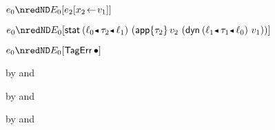 {\begin{lamportproof*}
    \begin{pfproof}
        \begin{pfproof}
          \qedstep
            \begin{pfproof}
              $\sexpr_0 \nredND \ctx_0[\esubst{\sexpr_2}{\svar_2}{\svalue_1}]$
            \end{pfproof}
        \end{pfproof}
        \begin{pfproof}
          \qedstep
            \begin{pfproof}
              $\sexpr_0 \nredND \ctx_0[\estab{\obnd{\sowner_0}{\stype_2}{\sowner_1}}{(\eapp{\stype_2}{\svalue_2}{(\edynb{\obnd{\sowner_1}{\stype_1}{\sowner_0}}{\svalue_1})})}]$
            \end{pfproof}
        \end{pfproof}
        \begin{pfproof}
          \qedstep
            \begin{pfproof}
              $\sexpr_0 \nredND \ctx_0[\tagerrorD]$
            \end{pfproof}
        \end{pfproof}
    \end{pfproof}

    \begin{pfproof}
      \qedstep
        \begin{pfproof}
          by  and 
        \end{pfproof}
    \end{pfproof}

    \begin{pfproof}
      \qedstep
        \begin{pfproof}
          by  and 
        \end{pfproof}
    \end{pfproof}

    \begin{pfproof}
      \qedstep
        \begin{pfproof}
          by  and 
        \end{pfproof}
    \end{pfproof}


\end{lamportproof*}}
